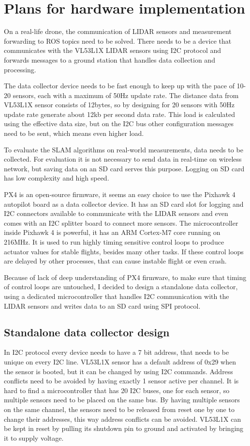 \section{Plans for hardware implementation}
On a real-life drone, the communication of LIDAR sensors and measurement forwarding to ROS topics need
to be solved. There needs to be a device that communicates with the VL53L1X LIDAR sensors using I2C
protocol and forwards messages to a ground station that handles data collection and processing.

The data collector device needs to be fast enough to keep up with the pace of 10-20 sensors,
each with a maximum of 50Hz update rate. The distance data from VL53L1X sensor consists of 12bytes, 
so by designing for 20 sensors with 50Hz update rate generate about 12kb per second data rate. This 
load is calculated using the effective data size, but on the I2C bus other configuration messages 
need to be sent, which means even higher load.

To evaluate the SLAM algorithms on real-world measurements, data needs to be collected. 
For evaluation it is not necessary to send data in real-time on wireless network, but saving 
data on an SD card serves this purpose. Logging on SD card has low complexity and high speed. 

PX4 is an open-source firmware, it seems an easy choice to use the Pixhawk 4 autopilot board 
as a data collector device. It has an SD card slot for logging and I2C connectors available to
communicate with the LIDAR sensors and even comes with an I2C splitter board to connect more sensors.
The microcontroller inside Pixhawk 4 is powerful, it has an ARM Cortex-M7 core running on 216MHz. 
It is used to run highly timing sensitive control loops to produce actuator values for stable flights,
besides many other tasks. If these control loops are delayed by other processes, that can 
cause instable flight or even crash.

Because of lack of deep understanding of PX4 firmware, to make sure that timing of control loops 
are untouched, I decided to design a standalone data collector, using a dedicated microcontroller that
handles I2C communication with the LIDAR sensors and writes data to an SD card using SPI protocol.

\subsection{Standalone data collector design}
In I2C protocol every device needs to have a 7 bit address, that needs to be unique on every
I2C line. VL53L1X sensor has a default address of 0x29 when the sensor is booted, but it can be changed
by using I2C commands. Address conflicts need to be avoided by having exactly 1 sensor active per channel.
It is hard to find a microcontroller that has 20 I2C buses, one for each sensor, so multiple sensors
need to be placed on the same bus. By having multiple sensors on the same channel, the sensors need to 
be released from reset one by one to change their addresses, this way address conflicts can be avoided.
VL53L1X can be kept in reset by pulling its shutdown pin to ground and activated by bringing it to 
supply voltage. 

